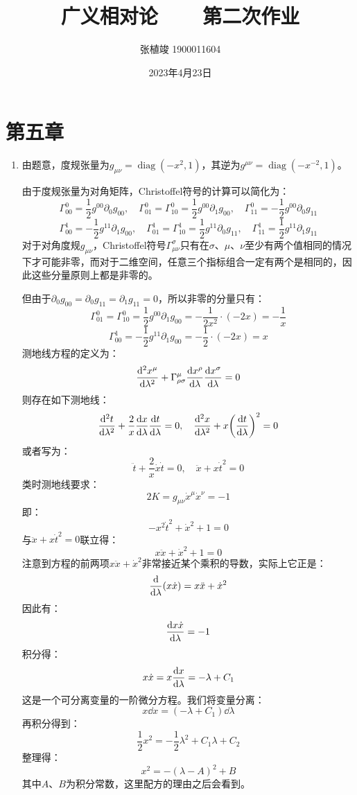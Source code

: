 \documentclass[a4paper]{article}
\title{\textbf{广义相对论\ \ \ \ 第二次作业}}
\author{张植竣 1900011604}
\date{2023年4月23日}
\DeclareMathOperator{\diag}{diag}
\begin{document}
\maketitle

\section*{第五章}

\begin{enumerate}
    \item[7.]
    由题意，度规张量为$g_{\mu\nu} = \diag(-x^2, 1)$，其逆为$g^{\mu\nu} = \diag(-x^{-2}, 1)$。

    由于度规张量为对角矩阵，Christoffel符号的计算可以简化为：
    \[
        \Gamma^0_{00} = \frac{1}{2} g^{00} \partial_0 g_{00},\quad \Gamma^0_{01} = \Gamma^0_{10} = \frac{1}{2} g^{00} \partial_1 g_{00},\quad \Gamma^0_{11} = - \frac{1}{2} g^{00} \partial_0 g_{11}
    \]
    \[
        \Gamma^1_{00} = -\frac{1}{2} g^{11} \partial_1 g_{00},\quad \Gamma^1_{01} = \Gamma^1_{10} = \frac{1}{2} g^{11} \partial_0 g_{11},\quad \Gamma^1_{11} = \frac{1}{2} g^{11} \partial_1 g_{11}
    \]
    对于对角度规$g_{\mu\nu}$，Christoffel符号$\Gamma^\sigma_{\mu\nu}$只有在$\sigma$、$\mu$、$\nu$至少有两个值相同的情况下才可能非零，而对于二维空间，任意三个指标组合一定有两个是相同的，因此这些分量原则上都是非零的。

    但由于$\partial_0 g_{00} = \partial_0 g_{11} = \partial_1 g_{11} = 0$，所以非零的分量只有：
    \[
        \Gamma^0_{01} = \Gamma^0_{10} = \frac{1}{2} g^{00} \partial_1 g_{00} = -\frac{1}{2x^2} \cdot (-2x) = -\frac{1}{x}
    \]
    \[
        \Gamma^1_{00} = -\frac{1}{2} g^{11} \partial_1 g_{00} = -\frac{1}{2} \cdot (-2x) = x
    \]
    测地线方程的定义为：
    \[
        \dv[2]{x^\mu}{\lambda} + \Gamma^\mu_{\rho\sigma} \dv{x^\rho}{\lambda} \dv{x^\sigma}{\lambda} = 0
    \]
    则存在如下测地线：
    \[
        \dv[2]{t}{\lambda} + \frac{2}{x} \dv{x}{\lambda} \dv{t}{\lambda} = 0,\quad \dv[2]{x}{\lambda} + x \qty(\dv{t}{\lambda})^2 = 0
    \]
    或者写为：
    \[
        \ddot{t} + \frac{2}{x}\dot{x}\dot{t} = 0,\quad \ddot{x} + x \dot{t}^2 = 0
    \]
    类时测地线要求：
    \[
        2K = g_{\mu\nu} \dot{x}^\mu \dot{x}^\nu = -1
    \]
    即：
    \[
        -x^2 \dot{t}^2 + \dot{x}^2 + 1 = 0
    \]
    与$\ddot{x} + x \dot{t}^2 = 0$联立得：
    \[
        x \ddot{x} + \dot{x}^2 + 1 = 0
    \]
    注意到方程的前两项$x \ddot{x} + \dot{x}^2$非常接近某个乘积的导数，实际上它正是：
    \[
        \dv{\lambda}(x \dot{x}) = x \ddot{x} + \dot{x}^2
    \]
    因此有：
    \[
        \dv{x \dot{x}}{\lambda} = -1
    \]
    积分得：
    \[
        x \dot{x} = x \dv{x}{\lambda} = -\lambda + C_1
    \]
    这是一个可分离变量的一阶微分方程。我们将变量分离：
    \[
        x \dd{x} = (-\lambda + C_1) \dd{\lambda}
    \]
    再积分得到：
    \[
        \frac{1}{2}x^2 = -\frac{1}{2}\lambda^2 + C_1 \lambda + C_2
    \]
    整理得：
    \[
        x^2 = -(\lambda - A)^2 + B
    \]
    其中$A$、$B$为积分常数，这里配方的理由之后会看到。


\end{enumerate}
\end{document}

